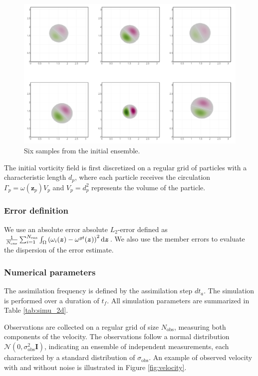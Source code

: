 \begin{figure}[ht]
    \centering
    \includegraphics[width=0.9\linewidth]{images/app2d/ensemble_sample.png}
    \caption{Six samples from the initial ensemble.}
    \label{fig:sample_ens}
\end{figure}

The initial vorticity field is first discretized on a regular grid of particles with a characteristic length $d_p$, where each particle receives the circulation $\Gamma_p = \omega(\bm z_p) V_p$ and $V_p = d_p^2$ represents the volume of the particle.

\subsubsection{Error definition}

We use an absolute error absolute \(L_2\)-error defined as $ \frac1{N_{\text{ens}}} \sum_{i = 1}^{N_{\text{ens}}} \int_\Omega \left(\omega_i(\bm{z}) - \omega^{gt}(\bm{z})\right)^2 \mathrm{d}\bm{z}$.
We also use the member errors to evaluate the dispersion of the error estimate.

\subsubsection{Numerical parameters}

The assimilation frequency is defined by the assimilation step $dt_a$. The simulation is performed over a duration of $t_f$. All simulation parameters are summarized in Table \ref{tab:simu_2d}.

Observations are collected on a regular grid of size $N_{\text{obs}}$, measuring both components of the velocity. The observations follow a normal distribution $\mathcal N(0, \sigma_{\text{obs}}^2 \bm{I})$, indicating an ensemble of independent measurements, each characterized by a standard distribution of $\sigma_{\text{obs}}$. An example of observed velocity with and without noise is illustrated in Figure \ref{fig:velocity}.

